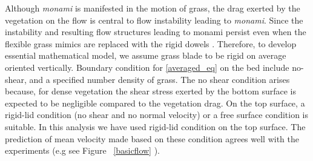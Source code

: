 \documentclass[12pt]{report}   %
\newcommand{\monami}{\textit{monami}}
\begin{document}
Although {\monami} is manifested in the motion of grass, the drag exerted by the vegetation on the flow is central to flow instability leading to {\monami}. Since the instability and resulting flow structures leading to monami persist even when the flexible grass mimics are replaced with the rigid dowels \cite{Ghisal02,Nepf06}. Therefore, to develop essential mathematical model, we assume grass blade to be rigid on average oriented vertically.
Boundary condition for \eqref{averaged_eq} on the bed include no-shear, and a specified number density of grass. The no shear condition arises because, for dense vegetation the shear stress exerted by the bottom surface is expected to be negligible compared to the vegetation drag. On the top surface, a rigid-lid condition (no shear and no normal velocity) or a free surface condition is suitable. In this analysis we have used rigid-lid condition on the top surface. The prediction of mean velocity made based on these condition agrees well with the experiments (e.g see Figure ~\ref{basicflow} ). 
%
\clearpage{\pagestyle{empty}\cleardoublepage}
\end{document}
